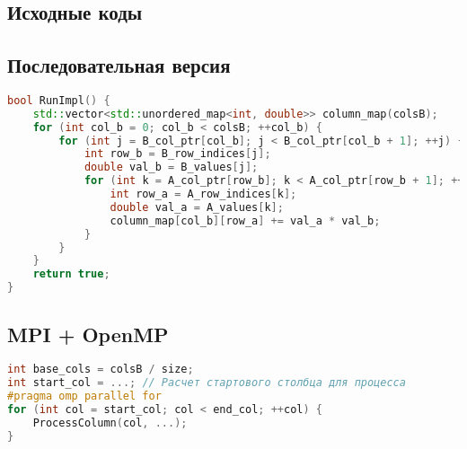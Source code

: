 \documentclass[12pt]{article}
\begin{document}
\newpage
\begin{appendices}
\section{Исходные коды}
\subsection{Последовательная версия}
\begin{lstlisting}[language=C++, caption=RunImpl из ops\_seq.cpp]
bool RunImpl() {
    std::vector<std::unordered_map<int, double>> column_map(colsB);
    for (int col_b = 0; col_b < colsB; ++col_b) {
        for (int j = B_col_ptr[col_b]; j < B_col_ptr[col_b + 1]; ++j) {
            int row_b = B_row_indices[j];
            double val_b = B_values[j];
            for (int k = A_col_ptr[row_b]; k < A_col_ptr[row_b + 1]; ++k) {
                int row_a = A_row_indices[k];
                double val_a = A_values[k];
                column_map[col_b][row_a] += val_a * val_b;
            }
        }
    }
    return true;
}
\end{lstlisting}

\subsection{MPI + OpenMP}
\begin{lstlisting}[language=C++, caption=Распределение столбцов в MPI]
int base_cols = colsB / size;
int start_col = ...; // Расчет стартового столбца для процесса
#pragma omp parallel for
for (int col = start_col; col < end_col; ++col) {
    ProcessColumn(col, ...);
}
\end{lstlisting}
\end{appendices}
\end{document}
